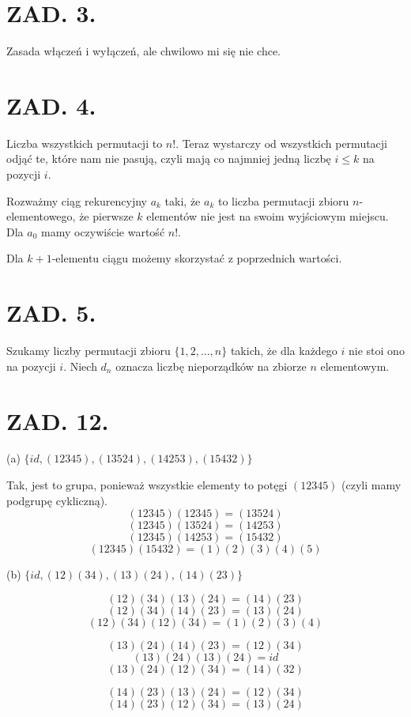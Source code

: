 \documentclass{article}[13pt]
\begin{document}
\section*{ZAD. 3.}

Zasada włączeń i wyłączeń, ale chwilowo mi się nie chce.

\section*{ZAD. 4.}

Liczba wszystkich permutacji to $n!$. Teraz wystarczy od wszystkich permutacji odjąć te, które nam nie pasują, czyli mają co najmniej jedną liczbę $i\leq k$ na pozycji $i$.

Rozważmy ciąg rekurencyjny $a_k$ taki, że $a_k$ to liczba permutacji zbioru $n$-elementowego, że pierwsze $k$ elementów nie jest na swoim wyjściowym miejscu. Dla $a_0$ mamy oczywiście wartość $n!$.

Dla $k+1$-elementu ciągu możemy skorzystać z poprzednich wartości.

\section*{ZAD. 5.}

Szukamy liczby permutacji zbioru $\{1,2,...,n\}$ takich, że dla każdego $i$ nie stoi ono na pozycji $i$. Niech $d_n$ oznacza liczbę nieporządków na zbiorze $n$ elementowym.


\section*{ZAD. 12.}

{\color{acc}(a)} $\{id, (12345), (13524), (14253), (15432)\}$
\smallskip

Tak, jest to grupa, ponieważ wszystkie elementy to potęgi $(12345)$ (czyli mamy podgrupę cykliczną).
$$(12345)(12345)=(13524)$$
$$(12345)(13524)=(14253)$$
$$(12345)(14253)=(15432)$$
$$(12345)(15432)=(1)(2)(3)(4)(5)$$

{\color{acc}(b)} $\{id, (12)(34), (13)(24), (14)(23)\}$
\smallskip

$$(12)(34)(13)(24)=(14)(23)$$
$$(12)(34)(14)(23)=(13)(24)$$
$$(12)(34)(12)(34)=(1)(2)(3)(4)$$

$$(13)(24)(14)(23)=(12)(34)$$
$$(13)(24)(13)(24)=id$$
$$(13)(24)(12)(34)=(14)(32)$$

$$(14)(23)(13)(24)=(12)(34)$$
$$(14)(23)(12)(34)=(13)(24)$$
\end{document}
